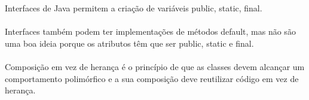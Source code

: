 \documentclass[../resumosLPOO.tex]{subfiles}
\begin{document}
 

Interfaces de Java permitem a criação de variáveis public, static, final.

\paragraph{}

Interfaces também podem ter implementações de métodos default, mas não são uma boa ideia porque os atributos têm que ser public, static e final.

\paragraph{}

Composição em vez de herança é o princípio de que as classes devem alcançar um comportamento polimórfico e a sua composição deve reutilizar código em vez de herança.
\end{document}

